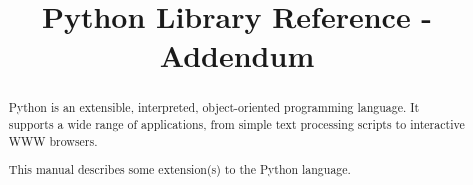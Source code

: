 \documentclass{howto}
\title{Python Library Reference - Addendum}
\begin{document}
\maketitle



\begin{abstract}

\noindent
Python is an extensible, interpreted, object-oriented programming
language.  It supports a wide range of applications, from simple text
processing scripts to interactive WWW browsers.

This manual describes some extension(s) to the Python language.
\end{abstract}

\tableofcontents




\end{document}
